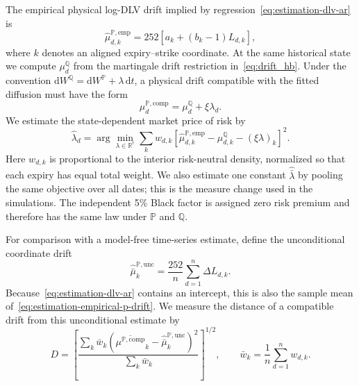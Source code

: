 \documentclass[11pt]{article}
\newcommand{\R}{\mathbb R}
\newcommand{\Q}{\mathbb Q}
\newcommand{\PP}{\mathbb P}
\newcommand{\dd}{\mathrm d}
\theoremstyle{plain}
\theoremstyle{definition}
\theoremstyle{remark}
\begin{document}
The empirical physical log-DLV drift implied by
regression~\eqref{eq:estimation-dlv-ar} is
\begin{equation}
\label{eq:estimation-empirical-p-drift}
\widehat\mu_{d,k}^{\PP,\mathrm{emp}}
=252\left[a_k+(b_k-1)L_{d,k}\right],
\end{equation}
where $k$ denotes an aligned expiry--strike coordinate.  At the same
historical state we compute $\mu_d^\Q$ from the martingale drift restriction
in~\eqref{eq:drift_hb}.  Under the convention
$\dd W^\Q=\dd W^\PP+\lambda\,\dd t$, a physical drift compatible with the
fitted diffusion must have the form
\begin{equation}
\label{eq:numerics-p-drift}
\mu_d^{\PP,\mathrm{comp}}=\mu_d^\Q+\xi\lambda_d.
\end{equation}
We estimate the state-dependent market price of risk by
\begin{equation}
\label{eq:numerics-statewise-lambda}
\widehat\lambda_d
=\arg\min_{\lambda\in\R^r}
\sum_k w_{d,k}
\left[
\widehat\mu_{d,k}^{\PP,\mathrm{emp}}-\mu_{d,k}^{\Q}
-(\xi\lambda)_k
\right]^2.
\end{equation}
Here $w_{d,k}$ is proportional to the interior risk-neutral density, normalized
so that each expiry has equal total weight.  We also estimate one constant
$\widehat{\bar\lambda}$ by pooling the same objective over all dates; this is
the measure change used in the simulations.  The independent 5\% Black factor
is assigned zero risk premium and therefore has the same law under $\PP$ and
$\Q$.

For comparison with a model-free time-series estimate, define the
unconditional coordinate drift
\begin{equation}
\label{eq:estimation-unconditional-p-drift}
\widehat{\bar\mu}^{\PP,\mathrm{unc}}_k
=\frac{252}{n}\sum_{d=1}^n\Delta L_{d,k}.
\end{equation}
Because~\eqref{eq:estimation-dlv-ar} contains an intercept, this is also the
sample mean of~\eqref{eq:estimation-empirical-p-drift}.  We measure the distance
of a compatible drift from this unconditional estimate by
\begin{equation}
\label{eq:estimation-unconditional-drift-distance}
D
=\left[
\frac{\sum_k\bar w_k
\left(\overline{\mu^{\PP,\mathrm{comp}}}_k
-\widehat{\bar\mu}^{\PP,\mathrm{unc}}_k\right)^2}
{\sum_k\bar w_k}
\right]^{1/2},
\qquad
\bar w_k=\frac1n\sum_{d=1}^n w_{d,k}.
\end{equation}
\end{document}
